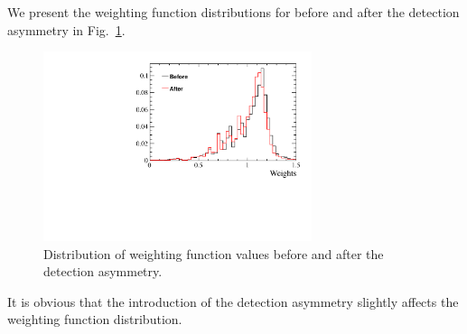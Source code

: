 \documentclass{article}
\begin{document}
        We present the weighting function distributions for before and after the detection asymmetry in Fig.~\ref{fig:weightsBeforeAfter}.
        \begin{figure}[h!]
                \centering
                \includegraphics[width = 0.7\textwidth]{../work/RapidSimAnalysis/NewWeightingFunction/Plots/WeighsBeforeAfter.pdf}
                \caption{Distribution of weighting function values before and after the detection asymmetry.}
                \label{fig:weightsBeforeAfter}
        \end{figure}
        It is obvious that the introduction of the detection asymmetry slightly affects the weighting function distribution.
\end{document}
